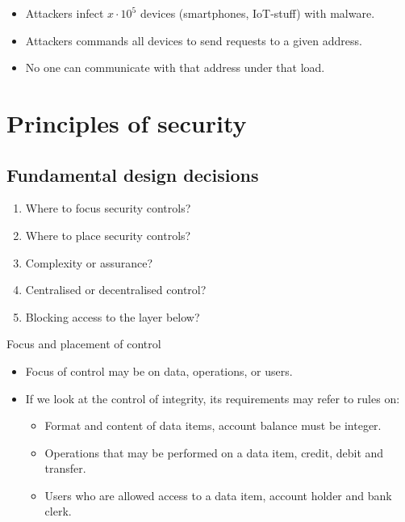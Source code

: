 \begin{frame}
  \begin{example}[DDoS]
    \begin{itemize}
      \item Attackers infect \(x\cdot 10^5\) devices (smartphones, IoT-stuff) 
        with malware.
      \item Attackers commands all devices to send requests to a given address.
      \item No one can communicate with that address under that load.
    \end{itemize}
  \end{example}
\end{frame}


\section{Principles of security}

\subsection{Fundamental design decisions}

\begin{frame}
  \begin{enumerate}
    \item Where to focus security controls?
    \item Where to place security controls?
    \item Complexity or assurance?
    \item Centralised or decentralised control?
    \item Blocking access to the layer below?
  \end{enumerate}
\end{frame}

\begin{frame}
  \begin{block}{Focus and placement of control}
    \begin{itemize}
      \item Focus of control may be on data, operations, or users.

      \item If we look at the control of integrity, its requirements may refer to 
        rules on:
        \begin{itemize}
          \item Format and content of data items, \eg account balance must be 
            integer.

          \item Operations that may be performed on a data item, \eg credit, debit 
            and transfer.

          \item Users who are allowed access to a data item, \eg account holder 
            and bank clerk.
        \end{itemize}
    \end{itemize}
  \end{block}
\end{frame}

